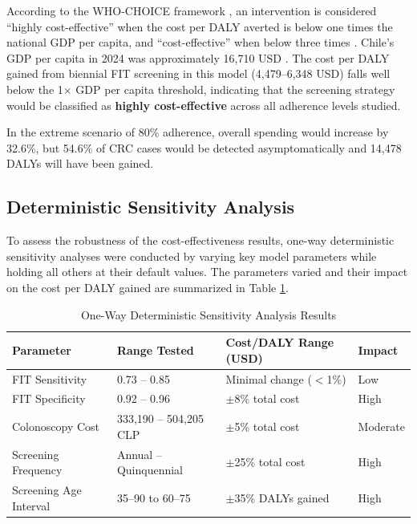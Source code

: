 \documentclass[sn-mathphys-num]{sn-jnl}%
\theoremstyle{thmstyleone}%
\theoremstyle{thmstyletwo}%
\theoremstyle{thmstylethree}%
\begin{document}
According to the WHO-CHOICE framework \cite{noauthor_who-choice_2024}, an intervention is considered ``highly cost-effective'' when the cost per DALY averted is below one times the national GDP per capita, and ``cost-effective'' when below three times \cite{hutubessy_generalized_2003}. Chile's GDP per capita in 2024 was approximately 16,710 USD \cite{noauthor_world_bank_chile_2024}. The cost per DALY gained from biennial FIT screening in this model (4,479--6,348 USD) falls well below the 1$\times$ GDP per capita threshold, indicating that the screening strategy would be classified as \textbf{highly cost-effective} across all adherence levels studied.

In the extreme scenario of 80\% adherence, overall spending would increase by 32.6\%, but 54.6\% of CRC cases would be detected asymptomatically and 14,478 DALYs will have been gained.

\subsection{Deterministic Sensitivity Analysis}

To assess the robustness of the cost-effectiveness results, one-way deterministic sensitivity analyses were conducted by varying key model parameters while holding all others at their default values. The parameters varied and their impact on the cost per DALY gained are summarized in Table \ref{table:sensitivity_analysis}.

\begin{table}[H]
\centering
\begin{tabularx}{\textwidth}{|X|X|X|X|}
\hline
\textbf{Parameter} & \textbf{Range Tested} & \textbf{Cost/DALY Range (USD)} & \textbf{Impact} \\ \hline
FIT Sensitivity & 0.73 -- 0.85 & Minimal change ($<$1\%) & Low \\ \hline
FIT Specificity & 0.92 -- 0.96 & $\pm$8\% total cost & High \\ \hline
Colonoscopy Cost & 333,190 -- 504,205 CLP & $\pm$5\% total cost & Moderate \\ \hline
Screening Frequency & Annual -- Quinquennial & $\pm$25\% total cost & High \\ \hline
Screening Age Interval & 35--90 to 60--75 & $\pm$35\% DALYs gained & High \\ \hline
\end{tabularx}
\caption{One-Way Deterministic Sensitivity Analysis Results}
\label{table:sensitivity_analysis}
\end{table}
\end{document}
